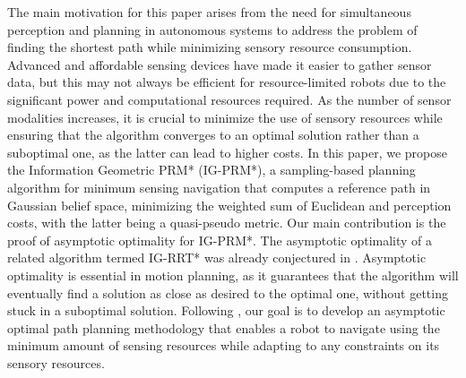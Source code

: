 \documentclass[Afour,sageh,times]{sagej}
\begin{document}
The main motivation for this paper arises from the need for simultaneous perception and planning in autonomous systems to address the problem of finding the shortest path while minimizing sensory resource consumption. Advanced and affordable sensing devices have made it easier to gather sensor data, but this may not always be efficient for resource-limited robots due to the significant power and computational resources required. As the number of sensor modalities increases, it is crucial to minimize the use of sensory resources while ensuring that the algorithm converges to an optimal solution rather than a suboptimal one, as the latter can lead to higher costs.
In this paper, we propose the Information Geometric PRM* (IG-PRM*), a sampling-based planning algorithm for minimum sensing navigation that computes a reference path in Gaussian belief space, minimizing the weighted sum of Euclidean and perception costs, with the latter being a quasi-pseudo metric. Our main contribution is the proof of asymptotic optimality for IG-PRM*. The asymptotic optimality of a related algorithm termed IG-RRT* was already conjectured in \cite{pedram2021gaussian}. Asymptotic optimality is essential in motion planning, as it guarantees that the algorithm will eventually find a solution as close as desired to the optimal one, without getting stuck in a suboptimal solution. Following \cite{pedram2021rationally,pedram2021gaussian}, our goal is to develop an asymptotic optimal path planning methodology that enables a robot to navigate using the minimum amount of sensing resources while adapting to any constraints on its sensory resources.
\end{document}
